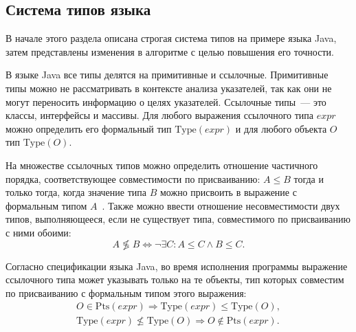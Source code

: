 \documentclass[14pt,titlepage]{extarticle}
\newcommand{\Type}[1]{\textrm{Type}(#1)}
\newcommand{\Pts}[1]{\textrm{Pts}(#1)}
\renewcommand{\leq}{\leqslant}
\newcommand{\incomp}{\not\lessgtr}
\newcommand{\eng}[1]{{\English#1}}
\newcommand{\java}{\eng{Java}\xspace}
\begin{document}
    \subsection{Система типов языка}
      \label{section:type_system}

      В начале этого раздела описана строгая система типов на примере языка
      \java, затем представлены изменения в алгоритме с целью повышения его
      точности.

      В языке \java все типы делятся на примитивные и ссылочные.
      Примитивные типы можно не рассматривать в контексте анализа указателей,
      так как они не могут переносить информацию о целях указателей.
      Ссылочные типы~--- это классы, интерфейсы и массивы.
      Для любого выражения ссылочного типа $expr$ можно определить его
      формальный тип $\Type{expr}$ и для любого объекта $O$ тип $\Type{O}$.

      На множестве ссылочных типов можно определить отношение частичного
      порядка, соответствующее совместимости по присваиванию:
      $A \leq B$ тогда и только тогда, когда значение типа $B$ можно присвоить
      в выражение с формальным типом $A$~\cite{nastia_type_analysis}.
      Также можно ввести отношение несовместимости двух типов, выполняющееся,
      если не существует типа, совместимого по присваиванию с ними обоими:
      \begin{equation}\label{eq:incomp}
        A \incomp B
        \Leftrightarrow
        \lnot \exists C\colon A \leq C \land B \leq C.
      \end{equation}

      Согласно спецификации языка \java, во время исполнения программы
      выражение ссылочного типа может указывать только на те объекты, тип
      которых совместим по присваиванию с формальным типом этого выражения:
      \begin{gather}
        O \in \Pts{expr}
        \Rightarrow
        \Type{expr} \leq \Type{O}, \\
        \label{eq:strict_typing}
        \Type{expr} \not\leq \Type{O}
        \Rightarrow
        O \not\in \Pts{expr}.
      \end{gather}
\end{document}
